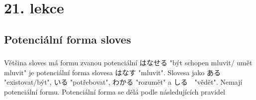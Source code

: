 \section{21. lekce}
\label{sec:lekce_21}

\subsection{Potenciální forma sloves}
\subsubsection{} Většina sloves má formu zvanou potenciální はなせる		"být schopen mluvit/ umět mluvit" je potenciální forma slovesa 	はなす	"mluvit". Slovesa jako ある	"existovat/být", 	いる	"potřebovat", 	わかる	"rozumět" a 	しる　"vědět". Nemají potenciální formu. Potenciální forma se dělá podle následujících pravidel 

